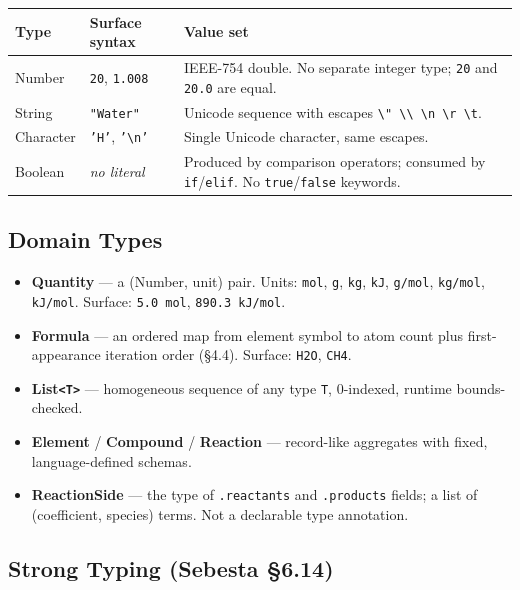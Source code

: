 \documentclass[11pt,a4paper]{article}
\newcommand{\code}[1]{\texttt{#1}}
\begin{document}
\begin{tabularx}{\textwidth}{@{} L{2.1cm} L{2.2cm} Y @{}}
\toprule
\textbf{Type} & \textbf{Surface syntax} & \textbf{Value set} \\
\midrule
Number   & \code{20}, \code{1.008} & IEEE-754 double. No separate integer type; \code{20} and \code{20.0} are equal. \\
String   & \code{"Water"}          & Unicode sequence with escapes \texttt{\textbackslash" \textbackslash\textbackslash\ \textbackslash n \textbackslash r \textbackslash t}. \\
Character& \code{'H'}, \code{'\textbackslash{}n'} & Single Unicode character, same escapes. \\
Boolean  & \textit{no literal}     & Produced by comparison operators; consumed by \code{if}/\code{elif}. No \code{true}/\code{false} keywords. \\
\bottomrule
\end{tabularx}

\subsection{Domain Types}

\begin{itemize}
\item \textbf{Quantity} --- a (Number, unit) pair. Units: \code{mol}, \code{g}, \code{kg}, \code{kJ}, \code{g/mol}, \code{kg/mol}, \code{kJ/mol}. Surface: \code{5.0 mol}, \code{890.3 kJ/mol}.
\item \textbf{Formula} --- an ordered map from element symbol to atom count plus first-appearance iteration order (\S4.4). Surface: \code{H2O}, \code{CH4}.
\item \textbf{List\texttt{<T>}} --- homogeneous sequence of any type \code{T}, 0-indexed, runtime bounds-checked.
\item \textbf{Element} / \textbf{Compound} / \textbf{Reaction} --- record-like aggregates with fixed, language-defined schemas.
\item \textbf{ReactionSide} --- the type of \code{.reactants} and \code{.products} fields; a list of (coefficient, species) terms. Not a declarable type annotation.
\end{itemize}

\subsection{Strong Typing (Sebesta \S6.14)}
\end{document}
